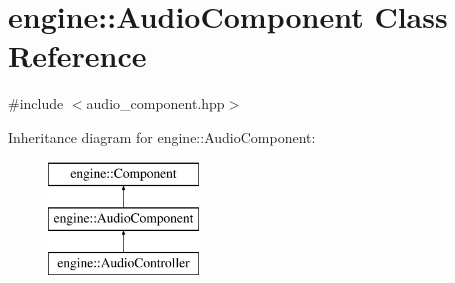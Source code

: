 \hypertarget{classengine_1_1_audio_component}{}\section{engine\+:\+:Audio\+Component Class Reference}
\label{classengine_1_1_audio_component}


{\ttfamily \#include $<$audio\+\_\+component.\+hpp$>$}

Inheritance diagram for engine\+:\+:Audio\+Component\+:\begin{figure}[H]
\begin{center}
\leavevmode
\includegraphics[height=3.000000cm]{classengine_1_1_audio_component}
\end{center}
\end{figure}
